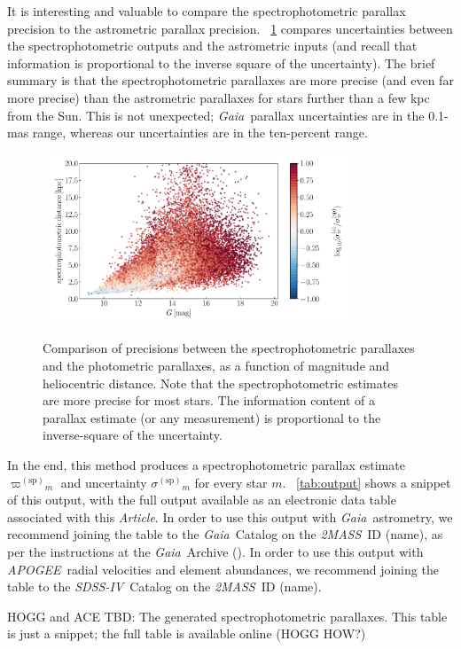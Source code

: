\documentclass[modern]{aastex62}
\newcommand{\documentname}{\textsl{Article}}
\newcommand{\acronym}[1]{{\small{#1}}}
\newcommand{\project}[1]{\textsl{#1}}
\newcommand{\apogee}{\project{\acronym{APOGEE}}}
\newcommand{\gaia}{\project{Gaia}}
\newcommand{\zmass}{\project{\acronym{2MASS}}}
\newcommand{\sdssiv}{\project{\acronym{SDSS-IV}}}
\newcommand{\sparallax}{{\varpi^{(\mathrm{sp})}}}
\newcommand{\ssigma}{{\sigma^{(\mathrm{sp})}}}
\begin{document}
It is interesting and valuable to compare the spectrophotometric parallax precision to
the astrometric parallax precision.
\figurename~\ref{fig:precision} compares uncertainties between the spectrophotometric
outputs and the astrometric inputs
(and recall that information is proportional to the inverse square of the uncertainty).
The brief summary is that the spectrophotometric parallaxes are more precise (and even
far more precise) than the astrometric parallaxes for stars further than a few kpc from
the Sun.
This is not unexpected; \gaia\ parallax uncertainties are in the 0.1-mas range, whereas
our uncertainties are in the ten-percent range.
\begin{figure}
\centering
~\hfill\includegraphics[width=0.8\textwidth]{./precision.pdf}\hfill~
\caption{Comparison of precisions between the spectrophotometric parallaxes and
the photometric parallaxes, as a function of magnitude and heliocentric distance.
Note that the spectrophotometric estimates are more precise for most stars.
The information content of a parallax estimate (or any measurement)
is proportional to the inverse-square of the uncertainty.\label{fig:precision}}
\end{figure}

In the end, this method produces a spectrophotometric parallax estimate $\sparallax_m$
and uncertainty $\ssigma_m$ for every star $m$.
\tablename~\ref{tab:output} shows a snippet of this output, with the full output available
as an electronic data table associated with this \documentname.
In order to use this output with \gaia\ astrometry, we recommend joining the table to the
\gaia\ Catalog on the \zmass\ ID (name), as per the instructions at the \gaia\ Archive (\citealt{gaiaarchive}).
In order to use this output with \apogee\ radial velocities and element abundances, we recommend
joining the table to the \sdssiv\ Catalog on the \zmass\ ID (name).
\begin{table}
\caption{HOGG and ACE TBD: The generated spectrophotometric parallaxes.
This table is just a snippet; the full table is available online (HOGG HOW?)\label{tab:output}}
\end{table}
\end{document}
